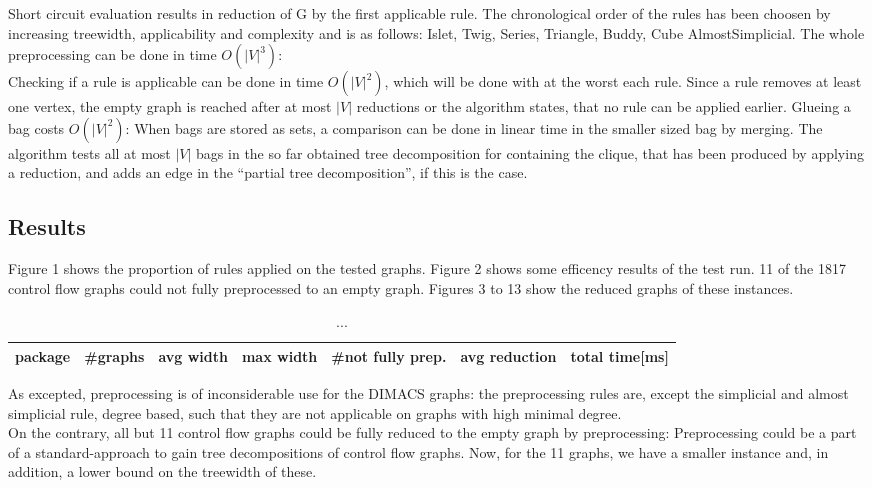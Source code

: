 \documentclass[a4wide]{article}
\begin{document}
Short circuit evaluation results in reduction of G by the first applicable rule. The chronological order of the rules has been choosen by increasing treewidth, applicability and complexity and is as follows: Islet, Twig, Series, Triangle, Buddy, Cube AlmostSimplicial. The whole preprocessing can be done in time $O(|V|^{3})$: \\
Checking if a rule is applicable can be done in time $O(|V|^{2})$, which will be done with at the worst each rule. Since a rule removes at least one vertex, the empty graph is reached after at most $|V|$ reductions or the algorithm states, that no rule can be applied earlier. Glueing a bag costs $O(|V|^{2})$: When bags are stored as sets, a comparison can be done in linear time in the smaller sized bag by merging. The algorithm tests all at most $|V|$ bags in the so far obtained tree decomposition for containing the clique, that has been produced by applying a reduction, and adds an edge in the \enquote{partial tree decomposition}, if this is the case. \\ 

\newpage

\subsection{Results}

Figure 1 shows the proportion of rules applied on the tested graphs. Figure 2 shows some efficency results of the test run. 11 of the 1817 control flow graphs could not fully preprocessed to an empty graph. Figures 3 to 13 show the reduced graphs of these instances.

\vspace*{5mm}

\begin{table}[h!]
\small{
\begin{tabular}{|l|l|l|l|l|l|l|}
\hline 
package & \#graphs & avg width & max width & \#not fully prep. & avg reduction & total time[ms] \\
\hline 
\hline 

\hline
\end{tabular}
}
\caption{...}
\end{table}

As excepted, preprocessing is of inconsiderable use for the DIMACS graphs: the preprocessing rules are, except the simplicial and almost simplicial rule, degree based, such that they are not applicable on graphs with high minimal degree. \\
On the contrary, all but 11 control flow graphs could be fully reduced to the empty graph by preprocessing: Preprocessing could be a part of a standard-approach to gain tree decompositions of control flow graphs. Now, for the 11 graphs, we have a smaller instance and, in addition, a lower bound on the treewidth of these.
\end{document}
